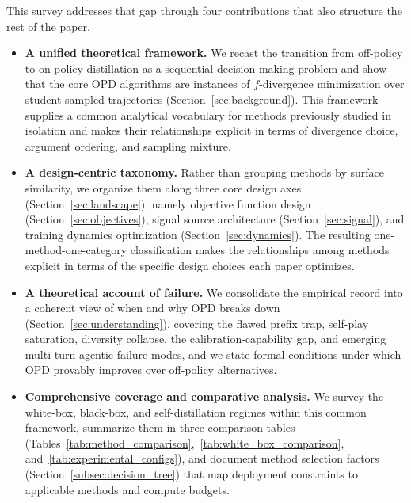 \documentclass{article} %
\begin{document}
This survey addresses that gap through four contributions that also structure the rest of the paper.
\begin{itemize}[leftmargin=1.5em]
    \item \textbf{A unified theoretical framework.} We recast the transition from off-policy to on-policy distillation as a sequential decision-making problem and show that the core OPD algorithms are instances of $f$-divergence minimization over student-sampled trajectories (Section~\ref{sec:background}). This framework supplies a common analytical vocabulary for methods previously studied in isolation and makes their relationships explicit in terms of divergence choice, argument ordering, and sampling mixture.
    \item \textbf{A design-centric taxonomy.} Rather than grouping methods by surface similarity, we organize them along three core design axes (Section~\ref{sec:landscape}), namely objective function design (Section~\ref{sec:objectives}), signal source architecture (Section~\ref{sec:signal}), and training dynamics optimization (Section~\ref{sec:dynamics}). The resulting one-method-one-category classification makes the relationships among methods explicit in terms of the specific design choices each paper optimizes.
    \item \textbf{A theoretical account of failure.} We consolidate the empirical record into a coherent view of when and why OPD breaks down (Section~\ref{sec:understanding}), covering the flawed prefix trap, self-play saturation, diversity collapse, the calibration-capability gap, and emerging multi-turn agentic failure modes, and we state formal conditions under which OPD provably improves over off-policy alternatives.
    \item \textbf{Comprehensive coverage and comparative analysis.} We survey the white-box, black-box, and self-distillation regimes within this common framework, summarize them in three comparison tables (Tables~\ref{tab:method_comparison},~\ref{tab:white_box_comparison}, and~\ref{tab:experimental_configs}), and document method selection factors (Section~\ref{subsec:decision_tree}) that map deployment constraints to applicable methods and compute budgets.
\end{itemize}
\end{document}
